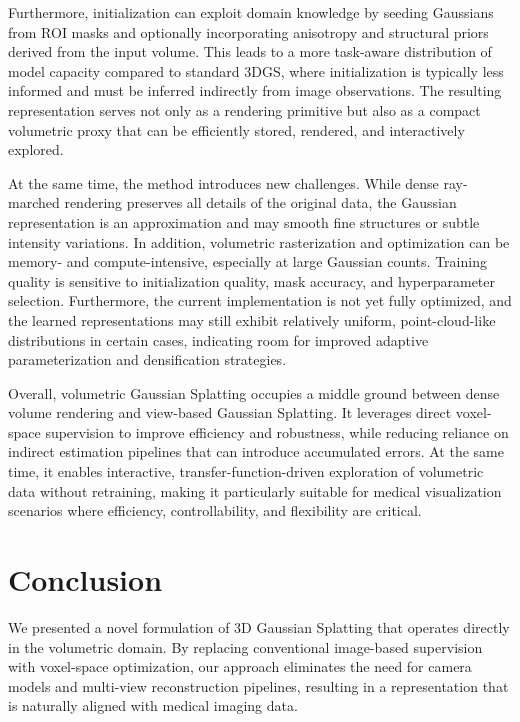\documentclass[runningheads]{llncs}
\begin{document}
Furthermore, initialization can exploit domain knowledge by seeding Gaussians from ROI masks and optionally incorporating anisotropy and structural priors derived from the input volume. This leads to a more task-aware distribution of model capacity compared to standard 3DGS, where initialization is typically less informed and must be inferred indirectly from image observations. The resulting representation serves not only as a rendering primitive but also as a compact volumetric proxy that can be efficiently stored, rendered, and interactively explored.

At the same time, the method introduces new challenges. While dense ray-marched rendering preserves all details of the original data, the Gaussian representation is an approximation and may smooth fine structures or subtle intensity variations. In addition, volumetric rasterization and optimization can be memory- and compute-intensive, especially at large Gaussian counts. Training quality is sensitive to initialization quality, mask accuracy, and hyperparameter selection. Furthermore, the current implementation is not yet fully optimized, and the learned representations may still exhibit relatively uniform, point-cloud-like distributions in certain cases, indicating room for improved adaptive parameterization and densification strategies.

Overall, volumetric Gaussian Splatting occupies a middle ground between dense volume rendering and view-based Gaussian Splatting. It leverages direct voxel-space supervision to improve efficiency and robustness, while reducing reliance on indirect estimation pipelines that can introduce accumulated errors. At the same time, it enables interactive, transfer-function-driven exploration of volumetric data without retraining, making it particularly suitable for medical visualization scenarios where efficiency, controllability, and flexibility are critical.


\section{Conclusion}

We presented a novel formulation of 3D Gaussian Splatting that operates directly in the volumetric domain. By replacing conventional image-based supervision with voxel-space optimization, our approach eliminates the need for camera models and multi-view reconstruction pipelines, resulting in a representation that is naturally aligned with medical imaging data.
\end{document}
